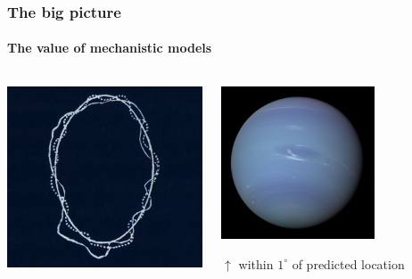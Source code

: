 {
\DarkMode
\begin{frame}
    \frametitle{The big picture}
    \framesubtitle{The value of mechanistic models}
    \begin{columns}
        \begin{column}{0.5\textwidth}
        \includegraphics[width=\textwidth]{figures/Orbit2_Wellcome-inv.png}
        \end{column}
        \begin{column}{0.5\textwidth}
        \begin{center}
        \includegraphics[width=0.65\textwidth]{figures/Neptune_-_Voyager_2_(29347980845)_flatten_crop.jpg} 
        \end{center}

        $\uparrow$ within $1^\circ$ of predicted location
        \end{column}
    \end{columns}
\end{frame}
}


